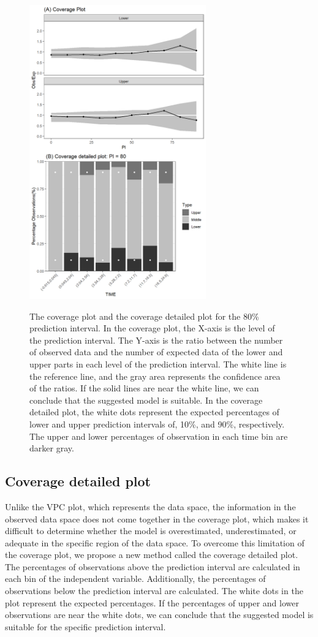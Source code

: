 \begin{figure}
\caption{The coverage plot and the coverage detailed plot for the 80\% prediction interval. In the coverage plot, the X-axis is the level of the prediction interval. The Y-axis is the ratio between the number of observed data and the number of expected data of the lower and upper parts in each level of the prediction interval. The white line is the reference line, and the gray area represents the confidence area of the ratios. If the solid lines are near the white line, we can conclude that the suggested model is suitable. In the coverage detailed plot, the white dots represent the expected percentages of lower and upper prediction intervals of, 10\%, and 90\%, respectively. The upper and lower percentages of observation in each time bin are darker gray. }
\centering
\includegraphics[width=3in,height=5in]{plotPNG/Fig4-1.png}
\label{Fig5}
\end{figure}


\hypertarget{coverageDetail}{%
\subsection{Coverage detailed plot}\label{coverageDetail}}

Unlike the VPC plot, which represents the data space, the information in the observed data space does not come together in the coverage plot, which makes it difficult to determine whether the model is overestimated, underestimated, or adequate in the specific region of the data space. To overcome this limitation of the coverage plot, we propose a new method called the coverage detailed plot.
 The percentages of observations above the prediction interval are calculated in each bin of the independent variable. Additionally, the percentages of observations below the prediction interval are calculated. The white dots in the plot represent the expected percentages. If the percentages of upper and lower observations are near the white dots,  we can conclude that the suggested model is suitable for the specific prediction interval.

